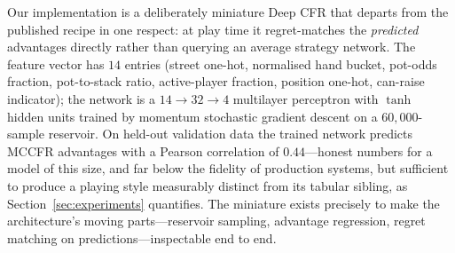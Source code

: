Our implementation is a deliberately miniature Deep CFR that departs from the published recipe in one respect: at play time it regret-matches the \emph{predicted} advantages directly rather than querying an average strategy network. The feature vector has $14$ entries (street one-hot, normalised hand bucket, pot-odds fraction, pot-to-stack ratio, active-player fraction, position one-hot, can-raise indicator); the network is a $14 \to 32 \to 4$ multilayer perceptron with $\tanh$ hidden units trained by momentum stochastic gradient descent on a $60{,}000$-sample reservoir. On held-out validation data the trained network predicts MCCFR advantages with a Pearson correlation of $0.44$---honest numbers for a model of this size, and far below the fidelity of production systems, but sufficient to produce a playing style measurably distinct from its tabular sibling, as Section~\ref{sec:experiments} quantifies. The miniature exists precisely to make the architecture's moving parts---reservoir sampling, advantage regression, regret matching on predictions---inspectable end to end.
